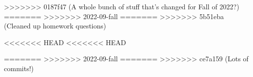 \documentclass{../../oss-apphys-exam}
\newcounter{lastmc}
\begin{document}
\begin{multicols*}{2}
\begin{questions}
%      
%    
%    
>>>>>>> 0187f47 (A whole bunch of stuff that's changed for Fall of 2022?)
=======
>>>>>>> 2022-09-fall
=======
>>>>>>> 5b51eba (Cleaned up homework questions)
  \end{questions}
  \setcounter{lastmc}{\value{question}}
\end{multicols*}
\newpage

<<<<<<< HEAD
<<<<<<< HEAD

\genfreedirections
=======
>>>>>>> 2022-09-fall
=======
>>>>>>> ce7a159 (Lots of commits!)
\end{document}

